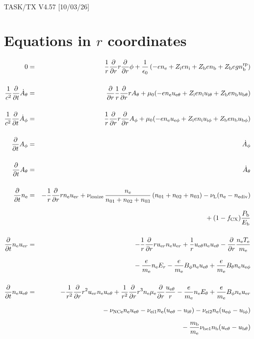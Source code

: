 \documentclass[11pt]{article}
\def\r#1{{\rm#1}}
\def\ddt{\frac{\partial}{\partial t}}
\def\ddr{\frac{\partial}{\partial r}}
\def\me{m_\r{e}}
\def\mb{m_\r{b}}
\def\mue{\mu_\r{e}}
\def\nee{n_\r{e}}
\def\ni{n_\r{i}}
\def\nb{n_\r{b}}
\def\uer{u_{\r{e}r}}
\def\ueth{u_{\r{e}\theta}}
\def\uith{u_{\r{i}\theta}}
\def\ubth{u_{\r{b}\theta}}
\def\ueph{u_{\r{e}\phi}}
\def\uiph{u_{\r{i}\phi}}
\def\ubph{u_{\r{b}\phi}}
\def\Er{E_r}
\def\Eth{E_\theta}
\def\Bth{B_\theta}
\def\Bph{B_\phi}
\def\Athd{\dot{A}_\theta}
\def\Aphd{\dot{A}_\phi}
\def\Ath{A_\theta}
\def\Aph{A_\phi}
\def\Te{T_\r{e}}
\def\nna{n_{01}}
\def\nnb{n_{02}}
\def\nnc{n_{03}}
\def\Zi{Z_\r{i}}
\def\Zb{Z_\r{b}}
\def\Pb{P_\r{b}}
\def\Eb{E_\r{b}}
\def\nbrp{n_\r{b}^\r{rp}}
\def\fCX{f_\r{CX}}
\def\nuNCe{\nu_\r{NCe}}
\def\nuL{\nu_\r{L}}
\def\nuion{\nu_\r{ionize}}
\def\nediv{n_\r{ediv}}
\begin{document}
\begin{center}
TASK/TX V4.57 [10/03/26]
\end{center}

\section{Equations in $r$ coordinates}
\vspace{-5mm}

\begin{eqnarray}
  0 &=&
%
    \frac{1}{r} \ddr r \ddr \phi
%
  + \frac{1}{\epsilon_0}
%
    \left(-e \nee + \Zi e \ni + \Zb e \nb + \Zb e g \nbrp \right)
\\[5mm]
  \frac{1}{c^2} \ddt \Athd &=&
%
    \ddr \frac{1}{r} \ddr r \Ath
%
  + \mu_0 (-e \nee \ueth + \Zi e \ni \uith + \Zb e \nb \ubth)
\\[5mm]
  \frac{1}{c^2} \ddt \Aphd &=&
%
  \frac{1}{r} \ddr r \ddr \Aph
%
  + \mu_0 (-e \nee \ueph + \Zi e \ni \uiph + \Zb e \nb \ubph)
%
\\[5mm]
  \ddt \Aph &=&
%
  \Aphd
\\[5mm]
  \ddt \Ath &=&
%
  \Athd
\\[5mm]
  \ddt\nee &=&
%
  - \frac{1}{r} \ddr r \nee \uer 
%
  + \nuion\, \frac{\nee}{\nna + \nnb + \nnc}\, (\nna + \nnb + \nnc)
%
  - \nuL (\nee - \nediv)
\nonumber\\[3mm]&&{}
%
  + (1 - \fCX) \frac{\Pb}{\Eb}
\\[5mm]
  \ddt \nee \uer &=&
%
  - \frac{1}{r} \ddr r \uer \nee \uer
%
  + \frac{1}{r} \ueth \nee \ueth
%
  - \ddr \frac{\nee \Te}{\me}
\nonumber\\[3mm]&&{}
%
  - \frac{e}{\me} \nee \Er
%
  - \frac{e}{\me} \Bph \nee \ueth
%
  + \frac{e}{\me} \Bth \nee \ueph
\\[5mm]
  \ddt \nee \ueth &=&
%
  - \frac{1}{r^2} \ddr r^2 \uer \nee \ueth
%
  + \frac{1}{r^2} \ddr r^3 \nee \mue \ddr \frac{\ueth}{r}
%
  - \frac{e}{\me} \nee \Eth
%
  + \frac{e}{\me} \Bph \nee \uer
\nonumber\\[2.5mm]&&{}
%
  - \nuNCe \nee \ueth
%
  - \nu_\r{ei1} \nee (\ueth - \uith)
%
  - \nu_\r{ei2} \nee (\ueph - \uiph)
\nonumber\\[2.5mm]&&{}
%
  - \frac{\mb}{\me} \nu_\r{be1} \nb (\ueth - \ubth)

\end{eqnarray}
\end{document}
